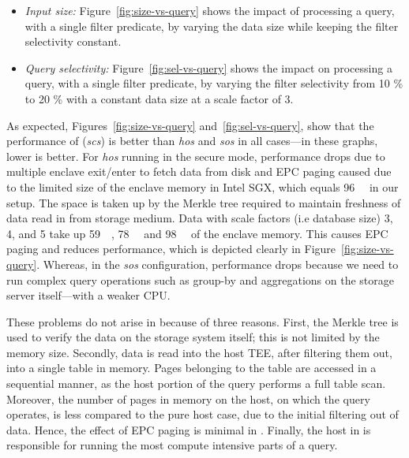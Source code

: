 \begin{itemize}[wide=0pt]
\item \vspace{1pt} {\em Input size:}
Figure~\ref{fig:size-vs-query} shows the impact of processing a query, with a single filter predicate, by varying the data size while keeping the filter selectivity constant.

\item{\em Query selectivity:}
Figure~\ref{fig:sel-vs-query} shows the impact on processing a query, with a single filter predicate, by varying the filter selectivity from 10 \% to 20 \% with a constant data size at a scale factor of 3.
\end{itemize}

 
 
As expected, Figures~\ref{fig:size-vs-query} and~\ref{fig:sel-vs-query}, show that the performance of \project{} (\emph{scs}) is better than \emph{hos} and \emph{sos} in all cases---in these graphs, lower is better.
%
%
For \emph{hos} %
running in the secure mode, performance drops due to multiple enclave exit/enter to fetch data from disk and EPC paging caused due to the limited size of the enclave memory in Intel SGX, which equals \SI{96}{\mebi\byte} in our setup. The space is taken up by the Merkle tree required to maintain freshness of data read in from storage medium. Data with scale factors (i.e database size) 3, 4, and 5 take up \SI{59}{\mebi\byte}, \SI{78}{\mebi\byte} and \SI{98}{\mebi\byte} of the enclave memory. This causes EPC paging and reduces performance, which is depicted clearly in Figure~\ref{fig:size-vs-query}. Whereas, in the \emph{sos} %
configuration, performance drops because we need to run complex query operations such as group-by and aggregations on the storage server itself---with a weaker CPU. %

These problems do not arise in \project{} because of three reasons. First, the Merkle tree is used to verify the data on the storage system itself; this is not limited by the memory size. Secondly, data is read into the host TEE, after filtering them out, into a single table in memory. Pages belonging to the table are accessed in a sequential manner, as the host portion of the query performs a full table scan. Moreover, the number of pages in memory on the host, on which the query operates, is less compared to the pure host case, due to the initial filtering out of data. Hence, the effect of EPC paging is minimal in \project{}. Finally, the host in \project{} is responsible for running the most compute intensive parts of a query.

